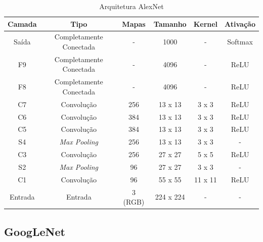 \begin{table}[]
\caption{Arquitetura AlexNet}
\centering
\begin{tabular}{|c|c|c|c|c|c|}
\hline
\textbf{Camada} & \textbf{Tipo}           & \textbf{Mapas} & \textbf{Tamanho} & \textbf{Kernel} & \textbf{Ativação} \\ \hline
Saída           & Completamente Conectada & -              & 1000             & -               & Softmax           \\ \hline
F9              & Completamente Conectada & -              & 4096             & -               & ReLU              \\ \hline
F8              & Completamente Conectada & -              & 4096             & -               & ReLU              \\ \hline
C7              & Convolução              & 256            & 13 x 13          & 3 x 3           & ReLU              \\ \hline
C6              & Convolução              & 384            & 13 x 13          & 3 x 3           & ReLU              \\ \hline
C5              & Convolução              & 384            & 13 x 13          & 3 x 3           & ReLU              \\ \hline
S4              & \textit{Max Pooling}    & 256            & 13 x 13          & 3 x 3           & -                 \\ \hline
C3              & Convolução              & 256            & 27 x 27          & 5 x 5           & ReLU              \\ \hline
S2              & \textit{Max Pooling}    & 96             & 27 x 27          & 3 x 3           & -                 \\ \hline
C1              & Convolução              & 96             & 55 x 55          & 11 x 11         & ReLU              \\ \hline
Entrada         & Entrada                 & 3 (RGB)        & 224 x 224        & -               & -                 \\ \hline
\end{tabular}
\label{alexnet}
\end{table}


\subsection{GoogLeNet}


